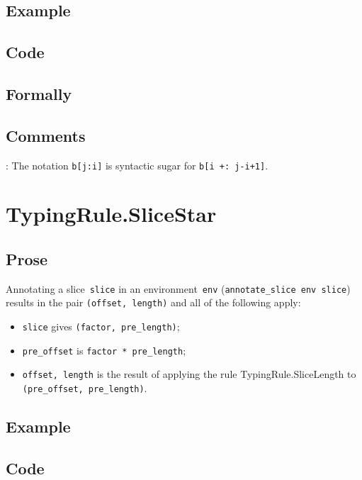\documentclass{book}
\begin{document}
  \subsection{Example}

  \subsection{Code}

\begin{emptyformal}
    \subsection{Formally}
\end{emptyformal}

\subsection{Comments}
    : The notation \texttt{b[j:i]} is syntactic sugar for \texttt{b[i +: j-i+1]}.

\section{TypingRule.SliceStar \label{sec:TypingRule.SliceStar}}

  \subsection{Prose}
      Annotating a slice~\texttt{slice} in an environment~\texttt{env}
(\texttt{annotate\_slice env slice}) results in the pair \texttt{(offset,
length)} and all of the following apply:
   \begin{itemize}
   \item \texttt{slice} gives \texttt{(factor, pre\_length)};
   \item \texttt{pre\_offset} is \texttt{factor * pre\_length};
   \item \texttt{offset, length} is the result of applying the rule TypingRule.SliceLength to \texttt{(pre\_offset, pre\_length)}.
   \end{itemize}

  \subsection{Example}

  \subsection{Code}
\end{document}
